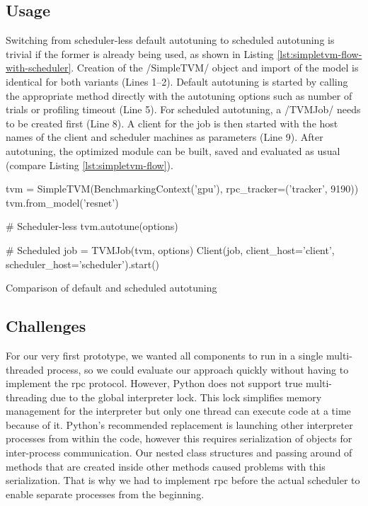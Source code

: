\subsection{Usage}
Switching from scheduler-less default autotuning to scheduled autotuning is trivial if the former is already being used, as shown in Listing \ref{lst:simpletvm-flow-with-scheduler}. Creation of the \pythoninline/SimpleTVM/ object and import of the model is identical for both variants (Lines 1--2). Default autotuning is started by calling the appropriate method directly with the autotuning options such as number of trials or profiling timeout (Line 5). For scheduled autotuning, a \pythoninline/TVMJob/ needs to be created first (Line 8). A client for the job is then started with the host names of the client and scheduler machines as parameters (Line 9). After autotuning, the optimized module can be built, saved and evaluated as usual (compare Listing \ref{lst:simpletvm-flow}).
\begin{listing}[h]
\begin{pythoncode}
tvm = SimpleTVM(BenchmarkingContext('gpu'), rpc_tracker=('tracker', 9190))
tvm.from_model('resnet')

# Scheduler-less
tvm.autotune(options)

# Scheduled
job = TVMJob(tvm, options)
Client(job, client_host='client', scheduler_host='scheduler').start()
\end{pythoncode}
\unskip
\caption{Comparison of default and scheduled autotuning}
\label{lst:simpletvm-flow-with-scheduler}
\end{listing}

\subsection{Challenges}
For our very first prototype, we wanted all components to run in a single multi-threaded process, so we could evaluate our approach quickly without having to implement the \gls{rpc} protocol. However, Python does not support true multi-threading due to the global interpreter lock. This lock simplifies memory management for the interpreter but only one thread can execute code at a time because of it. Python's recommended replacement is launching other interpreter processes from within the code, however this requires serialization of objects for inter-process communication. Our nested class structures and passing around of methods that are created inside other methods caused problems with this serialization. That is why we had to implement \gls{rpc} before the actual scheduler to enable separate processes from the beginning.

